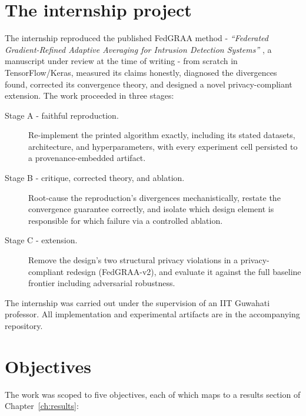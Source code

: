 \documentclass[11pt,a4paper]{report}
\begin{document}
\section{The internship project}
\label{sec:project}

The internship reproduced the published FedGRAA method - \emph{``Federated
Gradient-Refined Adaptive Averaging for Intrusion Detection Systems''}
\cite{fedgraa-paper}, a manuscript under review at the time of writing - from
scratch in TensorFlow/Keras, measured its claims honestly, diagnosed the
divergences found, corrected its convergence theory, and designed a novel
privacy-compliant extension. The work proceeded in three stages:

\begin{description}
\item[Stage A - faithful reproduction.] Re-implement the printed algorithm
exactly, including its stated datasets, architecture, and hyperparameters,
with every experiment cell persisted to a provenance-embedded artifact.
\item[Stage B - critique, corrected theory, and ablation.] Root-cause the
reproduction's divergences mechanistically, restate the convergence guarantee
correctly, and isolate which design element is responsible for which failure
via a controlled ablation.
\item[Stage C - extension.] Remove the design's two structural privacy
violations in a privacy-compliant redesign (FedGRAA-v2), and evaluate it
against the full baseline frontier including adversarial robustness.
\end{description}

The internship was carried out under the supervision of an IIT Guwahati
professor. All implementation and
experimental artifacts are in the accompanying repository.

\section{Objectives}
\label{sec:objectives}

The work was scoped to five objectives, each of which maps to a results
section of Chapter~\ref{ch:results}:
\end{document}
